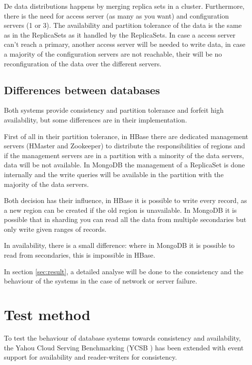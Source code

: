 \documentclass[final,5p,times]{elsarticle}
\begin{document}
De data distributions happens by merging replica sets in a cluster. Furthermore, there is the need for access server (as many as you want) and configuration servers (1 or 3). The availability and partition tolerance of the data is the same as in the ReplicaSets as it handled by the ReplicaSets. In case a access server can't reach a primary, another access server will be needed to write data, in case a majority of the configuration servers are not reachable, their will be no reconfiguration of the data over the different servers.  

\subsection{Differences between databases} 
Both systems provide consistency and partition tolerance and forfeit high availability, but some differences are in their implementation. 

First of all in their partition tolerance, in HBase there are dedicated management servers (HMaster and Zookeeper) to distribute the responsibilities of regions and if the management servers are in a partition with a minority of the data servers, data will be not available. In MongoDB the management of a ReplicaSet is done internally and the write queries will be available in the partition with the majority of the data servers.

Both decision has their influence, in HBase it is possible to write every record, as a new region can be created if the old region is unavailable. In MongoDB it is possible that in sharding you can read all the data from multiple secondaries but only write given ranges of records.

In availability, there is a small difference: where in MongoDB it is possible to read from secondaries, this is impossible in HBase. 

In section \ref{sec:result}, a detailed analyse will be done to the consistency and the behaviour of the systems in the case of network or server failure. 

\section{Test method}\label{sec:testmethod}
To test the behaviour of database systems towards consistency and availability, the Yahou Cloud Serving Benchmarking (YCSB \cite{cooper2010benchmarking}) has been extended with event support for availability and reader-writers for consistency.
\end{document}
